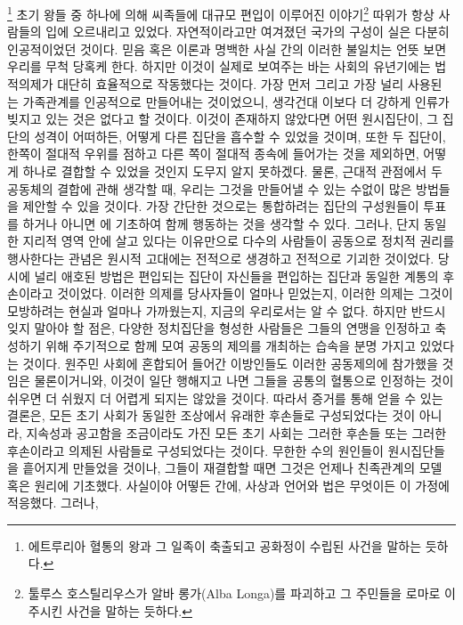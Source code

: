 \footnote{에트루리아 혈통의 왕과 그 일족이 축출되고 공화정이 수립된 사건을
말하는 듯하다.}
초기 왕들 중 하나에 의해 씨족들에 대규모 편입이 이루어진 이야기\footnote{%
  툴루스 호스틸리우스가 알바 롱가(Alba Longa)를 파괴하고
  그 주민들을 로마로 이주시킨 사건을 말하는 듯하다.}
따위가 항상 사람들의 입에 오르내리고 있었다.
자연적이라고만 여겨졌던 국가의 구성이 실은 다분히 인공적이었던 것이다.
믿음 혹은 이론과 명백한 사실 간의 이러한 불일치는 언뜻 보면
우리를 무척 당혹케 한다.
하지만 이것이 실제로 보여주는 바는
사회의 유년기에는 법적의제가 대단히 효율적으로 작동했다는 것이다.
가장 먼저 그리고 가장 널리 사용된 는
가족관계를 인공적으로 만들어내는 것이었으니,
생각건대 이보다 더 강하게 인류가 빚지고 있는 것은 없다고 할 것이다.
이것이 존재하지 않았다면
어떤 원시집단이, 그 집단의 성격이 어떠하든,
어떻게 다른 집단을 흡수할 수 있었을 것이며,
또한 두 집단이,
한쪽이 절대적 우위를 점하고 다른 쪽이 절대적 종속에 들어가는 것을 제외하면,
어떻게 하나로 결합할 수 있었을 것인지
도무지 알지 못하겠다.
물론,
근대적 관점에서 두 공동체의 결합에 관해 생각할 때,
우리는 그것을 만들어낼 수 있는 수없이 많은 방법들을 제안할 수 있을 것이다.
가장 간단한 것으로는 통합하려는 집단의 구성원들이 투표를 하거나
아니면 에 기초하여 함께 행동하는 것을 생각할 수 있다.
그러나,
단지 동일한 지리적 영역 안에 살고 있다는 이유만으로
다수의 사람들이 공동으로 정치적 권리를 행사한다는
관념은 원시적 고대에는 전적으로 생경하고 전적으로 기괴한 것이었다.
당시에 널리 애호된 방법은
편입되는 집단이 자신들을 편입하는 집단과 동일한 계통의 후손이라고
 것이었다.
이러한 의제를 당사자들이 얼마나 믿었는지,
이러한 의제는 그것이 모방하려는 현실과 얼마나 가까웠는지,
지금의 우리로서는 알 수 없다.
하지만 반드시 잊지 말아야 할 점은,
다양한 정치집단을 형성한 사람들은
그들의 연맹을 인정하고 축성하기 위해
주기적으로 함께 모여
공동의 제의를 개최하는 습속을
분명 가지고 있었다는 것이다.
원주민 사회에 혼합되어 들어간 이방인들도 이러한 공동제의에 참가했을
것임은 물론이거니와,
이것이 일단 행해지고 나면 그들을 공통의 혈통으로 인정하는 것이
쉬우면 더 쉬웠지 더 어렵게 되지는 않았을 것이다.
따라서 증거를 통해 얻을 수 있는 결론은,
모든 초기 사회가 동일한 조상에서 유래한 후손들로 구성되었다는 것이 아니라,
지속성과 공고함을 조금이라도 가진 모든 초기 사회는 그러한 후손들 또는
그러한 후손이라고 의제된 사람들로 구성되었다는 것이다.
무한한 수의 원인들이 원시집단들을 흩어지게 만들었을 것이나,
그들이 재결합할 때면 그것은 언제나 친족관계의 모델 혹은 원리에
기초했다.
사실이야 어떻든 간에, 사상과 언어와 법은 무엇이든 이 가정에 적응했다.
그러나,
